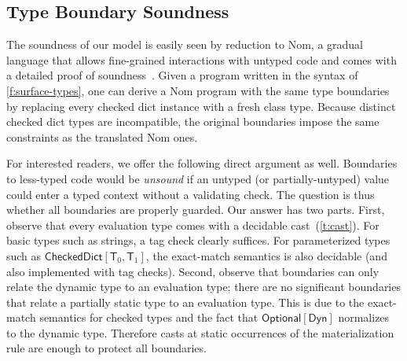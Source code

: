 \documentclass[english,cleveref,submission]{programming}
\newcommand{\code}[1]{\texttt{#1}}
\newcommand{\spapp}[2]{#1\,(#2)}
\newcommand{\spann}[2]{#1\!:\!#2}
\newcommand{\typefont}[1]{\mathsf{#1}}
\newcommand{\codefont}[1]{\emph{#1}}
\newcommand{\paramtype}[2]{#1[#2]}
\newcommand{\spteval}{\typefont{T}}
\newcommand{\sptclass}{\typefont{C}}
\newcommand{\sptdyn}{\typefont{Dyn}}
\newcommand{\sptoptional}[1]{\paramtype{\typefont{Optional}}{#1}}
\newcommand{\sptrawchkdict}{\typefont{CheckedDict}} %
\newcommand{\sptchkdict}[2]{\paramtype{\sptrawchkdict}{#1, #2}}
\newcommand{\sptenv}{\Gamma} %
\newcommand{\sptvardef}[2]{\spann{#1}{#2}}
\newcommand{\spx}{\code{x}}
\newcommand{\spf}{\code{f}}
\newcommand{\spc}{\sptclass}
\newcommand{\spexpr}{\codefont{expr}}
\newcommand{\vdashsub}[1]{\vdash_{#1}}
\newcommand{\wtprog}{\vdashsub{\mathbf{P}}}
\newcommand{\wtexpr}{\vdashsub{\mathbf{E}}}
\newcommand{\spvardef}[3]{\sptvardef{#1}{#2} = #3}
\newcommand{\spfundef}[4]{\mathrm{def}~\spapp{#1}{#2}\code{ -> }#3: #4}
\newcommand{\spclassdef}[4]{\mathrm{class}~\spapp{#1}{#2}:~#3;~#4}
\newcommand{\spself}{\code{self}}
\begin{document}
%


\subsection{Type Boundary Soundness}
\label{s:ts}

The soundness of our model is easily seen by reduction to Nom, a gradual
language that allows fine-grained interactions with untyped code and comes with
a detailed proof of soundness~\cite{mt-oopsla-2017,mt-oopsla-2021}.
Given a program written in the syntax of \cref{f:surface-types}, one can derive
a Nom program with the same type boundaries by replacing every checked
dict instance with a fresh class type.
Because distinct checked dict types are incompatible, the
original boundaries impose the same constraints as the translated Nom ones.

For interested readers, we offer the following direct argument as well.
Boundaries to less-typed code would be \emph{unsound} if an untyped
(or partially-untyped) value could enter a typed context without
a validating check.
The question is thus whether all boundaries are properly guarded.
Our answer has two parts.
First, observe that every evaluation type comes with a decidable
cast~(\cref{t:cast}).
For basic types such as strings, a tag check clearly suffices.
For parameterized types such as $\sptchkdict{\spteval_0}{\spteval_1}$,
the exact-match semantics is also decidable (and also implemented with
tag checks).
Second, observe that boundaries can only relate the dynamic type to an
evaluation type; there are no significant boundaries that relate a partially
static type to an evaluation type.
This is due to the exact-match semantics for checked types and the fact that
$\sptoptional{\sptdyn}$ normalizes to the dynamic type.
Therefore casts at static occurrences of the materialization rule are
enough to protect all boundaries.
\end{document}
